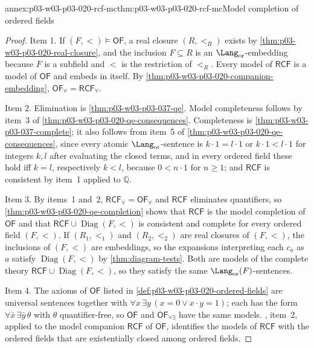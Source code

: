 \begin{annexitem}{annex:p03-w03-p03-020-rcf-mc}{thm:p03-w03-p03-020-rcf-mc}{Model completion of ordered fields}
\begin{proof}
Item 1. If \((F,<)\models\mathsf{OF}\), a real closure \((R,<_R)\) exists
by \cref{thm:p03-w03-p03-020-real-closure}, and the inclusion
\(F\subseteq R\) is an \(\Lang_{\mathrm{or}}\)-embedding because \(F\) is a
subfield and \(<\) is the restriction of \(<_R\). Every model of
\(\mathsf{RCF}\) is a model of \(\mathsf{OF}\) and embeds in itself. By
\cref{thm:p03-w03-p03-020-companion-embedding},
\(\mathsf{OF}_\forall=\mathsf{RCF}_\forall\).

Item 2. Elimination is \cref{thm:p03-w03-p03-037-qe}. Model completeness
follows by item~3 of \cref{thm:p03-w03-p03-020-qe-consequences}.
Completeness is \cref{thm:p03-w03-p03-037-complete}; it also follows from
item~5 of \cref{thm:p03-w03-p03-020-qe-consequences}, since every atomic
\(\Lang_{\mathrm{or}}\)-sentence is \(k\cdot1=l\cdot1\) or
\(k\cdot1<l\cdot1\) for integers \(k,l\) after evaluating the closed terms,
and in every ordered field these hold iff \(k=l\), respectively \(k<l\),
because \(0<n\cdot1\) for \(n\ge1\); and \(\mathsf{RCF}\) is consistent by
item~1 applied to \(\mathbb Q\).

Item 3. By items~1 and~2, \(\mathsf{RCF}_\forall=\mathsf{OF}_\forall\) and
\(\mathsf{RCF}\) eliminates quantifiers, so
\cref{thm:p03-w03-p03-020-qe-completion} shows that \(\mathsf{RCF}\) is the
model completion of \(\mathsf{OF}\) and that
\(\mathsf{RCF}\cup\operatorname{Diag}(F,<)\) is consistent and complete for
every ordered field \((F,<)\). If \((R_1,<_1)\) and \((R_2,<_2)\) are real
closures of \((F,<)\), the inclusions of \((F,<)\) are embeddings, so the
expansions interpreting each \(c_a\) as \(a\) satisfy
\(\operatorname{Diag}(F,<)\) by \cref{thm:diagram-tests}. Both are models of
the complete theory \(\mathsf{RCF}\cup\operatorname{Diag}(F,<)\), so they
satisfy the same \(\Lang_{\mathrm{or}}(F)\)-sentences.

Item 4. The axioms of \(\mathsf{OF}\) listed in
\cref{def:p03-w03-p03-020-ordered-fields} are universal sentences together
with \(\forall x\,\exists y\,(x=0\lor x\mathbin{\cdot}y=1)\); each has the
form \(\forall\bar x\,\exists\bar y\,\theta\) with \(\theta\)
quantifier-free, so \(\mathsf{OF}\) and \(\mathsf{OF}_{\forall\exists}\)
have the same models. , item~2,
applied to the model companion \(\mathsf{RCF}\) of \(\mathsf{OF}\),
identifies the models of \(\mathsf{RCF}\) with the ordered fields that are
existentially closed among ordered fields.


\end{proof}
\end{annexitem}
